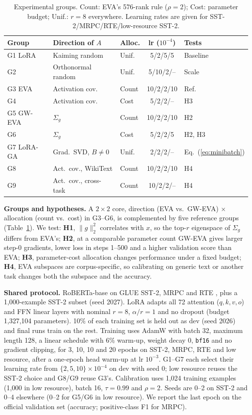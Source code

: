 \documentclass[letterpaper]{article} %
\newcommand{\Sg}{\Sigma_g}
\newcommand{\norm}[1]{\lVert #1\rVert}
\begin{document}
\begin{table}[t]
\centering
\small
\setlength{\tabcolsep}{3pt}
\begin{tabular}{@{}lllcl@{}}
\toprule
Group & Direction of $A$ & Alloc. & lr ($10^{-4}$) & Tests \\
\midrule
G1 LoRA & Kaiming random & Unif. & 5/2/5/5 & Baseline \\
G2 & Orthonormal random & Unif. & 5/10/2/-- & Scale \\
G3 EVA & Activation cov. & Count & 10/2/2/10 & Ref. \\
G4 & Activation cov. & Cost & 5/2/2/-- & H3 \\
G5 GW-EVA & $\Sg$ & Count & 10/2/2/10 & H2 \\
G6 & $\Sg$ & Cost & 5/2/2/5 & H2, H3 \\
G7 LoRA-GA & Grad.\ SVD, $B\neq0$ & Unif. & 2/2/2/-- & Eq.~(\ref{eq:minibatch}) \\
G8 & Act.\ cov., WikiText & Count & 10/2/2/10 & H4 \\
G9 & Act.\ cov., cross-task & Count & 10/2/2/-- & H4 \\
\bottomrule
\end{tabular}
\caption{Experimental groups. Count: EVA's 576-rank rule ($\rho=2$); Cost: parameter budget; Unif.: $r=8$ everywhere. Learning rates are given for SST-2/MRPC/RTE/low-resource SST-2.}
\label{tab:groups}
\end{table}

\textbf{Groups and hypotheses.} A $2\times2$ core, direction (EVA vs.\ GW-EVA) $\times$ allocation (count vs.\ cost) in G3--G6, is complemented by five reference groups (Table~\ref{tab:groups}). We test: \textbf{H1}, $\norm{g}_2^2$ correlates with $x$, so the top-$r$ eigenspace of $\Sg$ differs from EVA's; \textbf{H2}, at a comparable parameter count GW-EVA gives larger step-0 gradients, lower loss in steps 1--500 and a higher validation score than EVA; \textbf{H3}, parameter-cost allocation changes performance under a fixed budget; \textbf{H4}, EVA subspaces are corpus-specific, so calibrating on generic text or another task changes both the subspace and the accuracy.

\textbf{Shared protocol.} RoBERTa-base \citep{liu2019roberta} on GLUE SST-2, MRPC and RTE \citep{wang2019glue}, plus a 1,000-example SST-2 subset (seed 2027). LoRA adapts all 72 attention ($q,k,v,o$) and FFN linear layers with nominal $r=8$, $\alpha/r=1$ and no dropout (budget 1,327,104 parameters). 10\% of each training set is held out as dev (seed 2026) and final runs train on the rest. Training uses AdamW \citep{kingma2015adam,loshchilov2019decoupled} with batch 32, maximum length 128, a linear schedule with 6\% warm-up, weight decay 0, \texttt{bf16} and no gradient clipping, for 3, 10, 10 and 20 epochs on SST-2, MRPC, RTE and low resource, after a one-epoch head warm-up at lr $10^{-3}$. G1--G7 each select their learning rate from $\{2,5,10\}\times10^{-4}$ on dev with seed 0; low resource reuses the SST-2 choice and G8/G9 reuse G3's. Calibration uses 1,024 training examples (1,000 in low resource), batch 16, $\tau=0.99$ and $\rho=2$. Seeds are 0--2 on SST-2 and 0--4 elsewhere (0--2 for G5/G6 in low resource). We report the last epoch on the official validation set (accuracy; positive-class F1 for MRPC).
\end{document}
